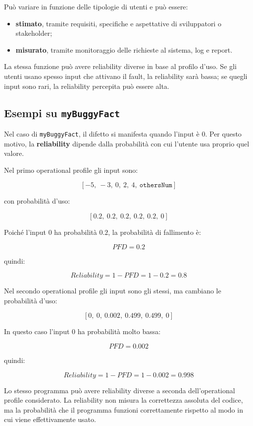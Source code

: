 Può variare in funzione delle tipologie di utenti e può essere:

\begin{itemize}
    \item \textbf{stimato}, tramite requisiti, specifiche e aspettative di sviluppatori o stakeholder;
    \item \textbf{misurato}, tramite monitoraggio delle richieste al sistema, log e report.
\end{itemize}

\begin{notaprof}
La stessa funzione può avere reliability diverse in base al profilo d'uso. Se gli utenti usano spesso input che attivano il fault, la reliability sarà bassa; se quegli input sono rari, la reliability percepita può essere alta.
\end{notaprof}

\subsection{Esempi su \texttt{myBuggyFact}}

Nel caso di \texttt{myBuggyFact}, il difetto si manifesta quando l'input è \(0\). Per questo motivo, la \textbf{reliability} dipende dalla probabilità con cui l'utente usa proprio quel valore.

Nel primo operational profile gli input sono:

\[
[-5,\ -3,\ 0,\ 2,\ 4,\ \texttt{othersNum}]
\]

con probabilità d'uso:

\[
[0.2,\ 0.2,\ 0.2,\ 0.2,\ 0.2,\ 0]
\]

Poiché l'input \(0\) ha probabilità \(0.2\), la probabilità di fallimento è:

\[
PFD = 0.2
\]

quindi:

\[
Reliability = 1 - PFD = 1 - 0.2 = 0.8
\]

Nel secondo operational profile gli input sono gli stessi, ma cambiano le probabilità d'uso:

\[
[0,\ 0,\ 0.002,\ 0.499,\ 0.499,\ 0]
\]

In questo caso l'input \(0\) ha probabilità molto bassa:

\[
PFD = 0.002
\]

quindi:

\[
Reliability = 1 - PFD = 1 - 0.002 = 0.998
\]
\begin{notaesame}
Lo stesso programma può avere reliability diverse a seconda dell'operational profile considerato. La reliability non misura la correttezza assoluta del codice, ma la probabilità che il programma funzioni correttamente rispetto al modo in cui viene effettivamente usato.
\end{notaesame}
